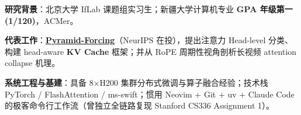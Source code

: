 \vspace{-8mm}
\vspace{3mm}
\begin{cvitems}
  \item {\textbf{研究背景}：北京大学 IfLab 课题组实习生；新疆大学计算机专业 \textbf{GPA 年级第一 (1/120)}，ACMer。}
  \item {\textbf{代表工作}：\textbf{\href{https://if-lab-pku.github.io/Pyramid-Forcing/}{Pyramid-Forcing}}（NeurIPS 在投），提出注意力 Head-level 分类、构建 head-aware \textbf{KV Cache} 框架；并从 RoPE 周期性视角剖析长视频 attention collapse 机理。}
  \item {\textbf{系统工程与基建}：具备 8×H200 集群分布式微调与算子融合经验；技术栈 PyTorch / FlashAttention / ms-swift；惯用 Neovim + Git + uv + Claude Code 的极客命令行工作流（曾独立全链路复现 Stanford CS336 Assignment 1）。}
\end{cvitems}
